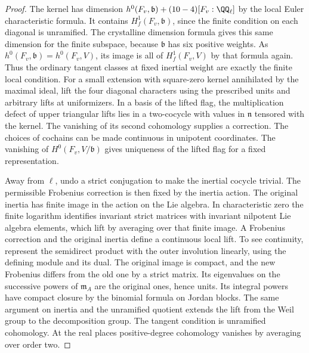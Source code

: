 \documentclass[a4paper,11pt]{article}
\theoremstyle{definition}
\theoremstyle{remark}
\numberwithin{equation}{section}
\begin{document}
\begin{proof}
The kernel has dimension
\(h^0(F_v,\mathfrak b)+(10-4)[F_v:\QQ_\ell]\) by the local
Euler characteristic formula. It contains \(H^1_f(F_v,\mathfrak b)\),
since the finite condition on each diagonal is unramified.
The crystalline dimension formula gives this same dimension
for the finite subspace, because \(\mathfrak b\) has six
positive weights. As \(h^0(F_v,\mathfrak b)=h^0(F_v,V)\),
its image is all of \(H^1_f(F_v,V)\) by that formula again.
Thus the ordinary tangent classes at fixed inertial weight
are exactly the finite local condition. For a small extension
with square-zero kernel annihilated by the maximal ideal,
lift the four diagonal characters using the prescribed units
and arbitrary lifts at uniformizers. In a basis of the lifted
flag, the multiplication defect of upper triangular lifts
lies in a two-cocycle with values in \(\mathfrak n\) tensored
with the kernel. The vanishing of its second cohomology
supplies a correction. The choices of cochains can be made
continuous in unipotent coordinates. The vanishing of
\(H^0(F_v,V/\mathfrak b)\) gives uniqueness of the lifted flag
for a fixed representation.

Away from \(\ell\), undo a strict conjugation to make the
inertial cocycle trivial. The permissible Frobenius correction
is then fixed by the inertia action. The original inertia has
finite image in the action on the Lie algebra. In characteristic
zero the finite logarithm identifies invariant strict matrices
with invariant nilpotent Lie algebra elements, which lift by
averaging over that finite image. A Frobenius correction and
the original inertia define a continuous local lift. To see
continuity, represent the semidirect product with the outer
involution linearly, using the defining module and its dual.
The original image is compact, and the new Frobenius differs
from the old one by a strict matrix. Its eigenvalues on the
successive powers of \(\mathfrak m_A\) are the original ones,
hence units. Its integral powers have compact closure by the
binomial formula on Jordan blocks. The same argument on
inertia and the unramified quotient extends the lift from
the Weil group to the decomposition group. The tangent
condition is unramified cohomology. At the real places
positive-degree cohomology vanishes by averaging over order two.


\end{proof}
\end{document}
